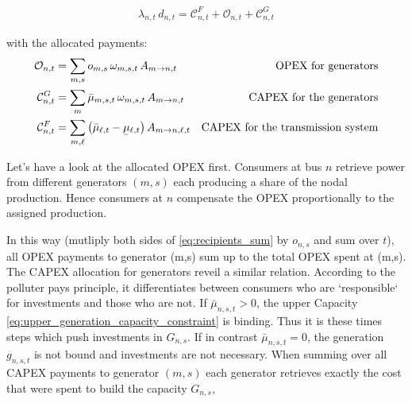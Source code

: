 \documentclass[11pt]{article}
\newcommand{\ubar}[1]{\underaccent{\bar}{#1}}
\newcommand{\generation}[1][n]{g_{#1,s,t}}
\newcommand{\generationshare}[1][n]{\omega_{#1,s,t}}
\newcommand{\capacityGeneration}{G_{n,s}}
\newcommand{\opexGeneration}[1][n]{o_{#1,s}}
\newcommand{\demandnodal}[1][n]{d_{#1,t}}
\newcommand{\muuppergeneration}[1][n]{\bar{\mu}_{#1,s,t}}
\newcommand{\mulowerflow}{\ubar{\mu}_{\ell,t}}
\newcommand{\muupperflow}{\bar{\mu}_{\ell,t}}
\newcommand{\lmp}[1][n]{\lambda_{#1,t}}
\newcommand{\allocatePeer}[1][m \rightarrow n]{A_{#1,t}}
\newcommand{\allocateTransaction}[1][m \rightarrow n]{A_{#1,\ell,t}}
\newcommand{\allocateCapexGeneration}[1][n]{\mathcal{C}^{G}_{#1,t}}
\newcommand{\allocateCapexFlow}[1][n]{\mathcal{C}^{F}_{#1,t}}
\newcommand{\allocateOpex}[1][n]{\mathcal{O}_{#1,t}}
\begin{document}
\begin{align}
 \lmp \, \demandnodal = \allocateCapexFlow + \allocateOpex + \allocateCapexGeneration
\end{align}

with the allocated payments: \\
\begin{align}
 \allocateOpex &= \sum_{m,s} \opexGeneration[m] \, \generationshare[m] \, \allocatePeer 
 &\text{OPEX for generators} 
 \label{eq:allocate_opexGeneration}\\
 \allocateCapexGeneration &= \sum_m \muuppergeneration[m] \, \generationshare[m] \, \allocatePeer
 &\text{CAPEX for the generators} 
  \label{eq:allocate_capexGeneration} \\
 \allocateCapexFlow &=  \sum_{m,\ell} \left( \muupperflow - \mulowerflow\right) \allocateTransaction  
 &\text{CAPEX for the transmission system} 
  \label{eq:allocate_capexFlow}
\end{align}

Let's have a look at the allocated OPEX first. Consumers at bus $n$ retrieve power from different generators $(m,s)$ each producing a share of the nodal production. Hence consumers at $n$ compensate the OPEX proportionally to the assigned production. 

 In this way (mutliply both sides of \cref{eq:recipients_sum} by $\opexGeneration$ and sum over $t$), all OPEX payments to generator (m,s) sum up to the total OPEX spent at (m,s). \\



The CAPEX allocation for generators reveil a similar relation. According to the polluter pays principle, it differentiates between consumers who are `responsible` for investments and those who are not. If $\muuppergeneration > 0$, the upper Capacity \cref{eq:upper_generation_capacity_constraint} is binding. Thus it is these times steps which push investments in $\capacityGeneration$. If in contrast $\muuppergeneration = 0$, the generation $\generation$ is not bound and investments are not necessary. 
When summing over all CAPEX payments to generator $(m,s)$ each generator retrieves exactly the cost that were spent to build the capacity $\capacityGeneration$,
\end{document}
